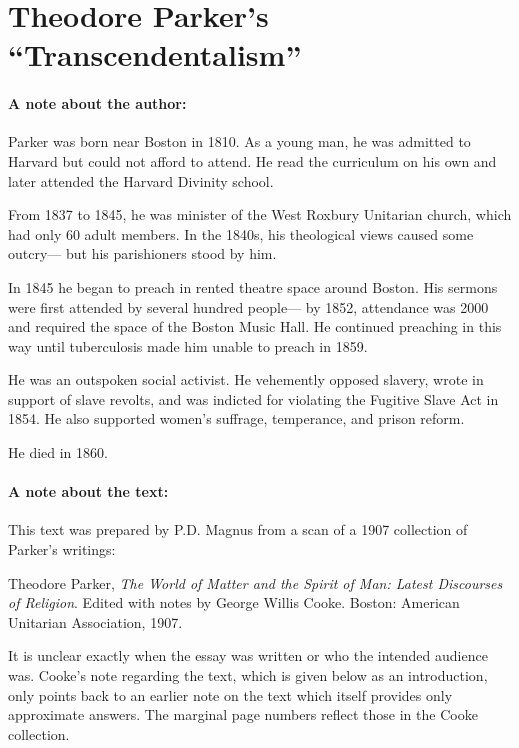 \documentclass[12pt]{article}
\begin{document}
\setcounter{footnote}{0}

\section*{Theodore Parker's ``Transcendentalism''}



\paragraph{A note about the author:}
Parker was born near Boston in 1810. As a young man, he was admitted to Harvard but could not afford to attend. He read the curriculum on his own and later attended the Harvard Divinity school.

From 1837 to 1845, he was minister of the West Roxbury Unitarian church, which had only 60 adult members. In the 1840s, his theological views caused some outcry--- but his parishioners stood by him.

In 1845 he began to preach in rented theatre space around Boston. His sermons were first attended by several hundred people--- by 1852, attendance was 2000 and required the space of the Boston Music Hall. He continued preaching in this way until tuberculosis made him unable to preach in 1859.

He was an outspoken social activist. He vehemently opposed slavery, wrote in support of slave revolts, and was indicted for violating the Fugitive Slave Act in 1854. He also supported women's suffrage, temperance, and prison reform.

He died in 1860.




\paragraph{A note about the text:}
This text was prepared by P.D. Magnus from a scan of a 1907 collection of Parker's writings:

\noindent Theodore Parker, \emph{The World of Matter and the Spirit of Man: Latest Discourses of Religion}. Edited with notes by George Willis Cooke. Boston: American Unitarian Association, 1907.

It is unclear exactly when the essay was written or who the intended audience was. Cooke's note regarding the text, which is given below as an introduction, only points back to an earlier note on the text which itself provides only approximate answers. The marginal page numbers reflect those in the Cooke collection.
\end{document}
